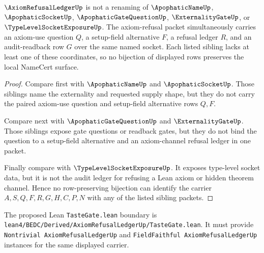 \begin{theorem}
\label{thm:axiom-refusal-ledger-sibling-independence}
$\AxiomRefusalLedgerUp$ is not a renaming of $\ApophaticNameUp$, $\ApophaticSocketUp$, $\ApophaticGateQuestionUp$, $\ExternalityGateUp$, or $\TypeLevelSocketExposureUp$. The axiom-refusal packet simultaneously carries an axiom-use question $Q$, a setup-field alternative $F$, a refusal ledger $R$, and an audit-readback row $G$ over the same named socket. Each listed sibling lacks at least one of these coordinates, so no bijection of displayed rows preserves the local NameCert surface.
\end{theorem}
\begin{proof}
Compare first with $\ApophaticNameUp$ and $\ApophaticSocketUp$. Those siblings name the externality and requested supply shape, but they do not carry the paired axiom-use question and setup-field alternative rows $Q,F$.

Compare next with $\ApophaticGateQuestionUp$ and $\ExternalityGateUp$. Those siblings expose gate questions or readback gates, but they do not bind the question to a setup-field alternative and an axiom-channel refusal ledger in one packet.

Finally compare with $\TypeLevelSocketExposureUp$. It exposes type-level socket data, but it is not the audit ledger for refusing a Lean axiom or hidden theorem channel. Hence no row-preserving bijection can identify the carrier $A,S,Q,F,R,G,H,C,P,N$ with any of the listed sibling packets.
\end{proof}



The proposed Lean \texttt{TasteGate.lean} boundary is \texttt{lean4/BEDC/Derived/AxiomRefusalLedgerUp/TasteGate.lean}. It must provide \texttt{Nontrivial AxiomRefusalLedgerUp} and \texttt{FieldFaithful AxiomRefusalLedgerUp} instances for the same displayed carrier.

